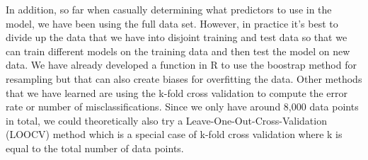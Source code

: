 \documentclass{article}
\begin{document}
In addition, so far when casually determining what predictors to use in the model, we have been using the full data set.  However, in practice it's best to divide up the data that we have into disjoint training and test data so that we can train different models on the training data and then test the model on new data.  We have already developed a function in R to use the boostrap method for resampling but that can also create biases for overfitting the data.  Other methods that we have learned are using the k-fold cross validation to compute the error rate or number of misclassifications.  Since we only have around 8,000 data points in total, we could theoretically also try a Leave-One-Out-Cross-Validation (LOOCV) method which is a special case of k-fold cross validation where k is equal to the total number of data points.\\
\end{document}
